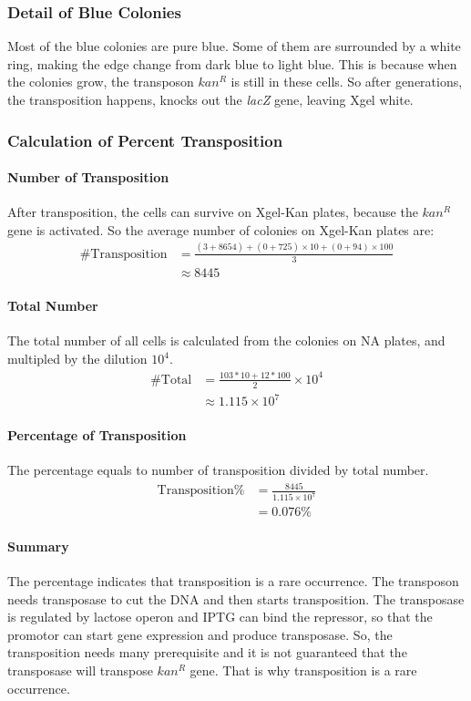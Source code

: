 \documentclass{article}
\begin{document}
			\subsubsection{Detail of Blue Colonies}
			Most of the blue colonies are pure blue. Some of them are surrounded by a white ring, making the edge change from dark blue to light blue. This is because when the colonies grow, the transposon $kan^R$ is still in these cells. So after generations, the transposition happens, knocks out the \emph{lacZ} gene, leaving Xgel white.

			\subsubsection{Calculation of Percent Transposition}
			\paragraph{Number of Transposition} After transposition, the cells can survive on Xgel-Kan plates, because the $kan^R$ gene is activated. So the average number of colonies on Xgel-Kan plates are:
			$$
			\begin{aligned}
			\#\text{Transposition} &= \frac{(3 + 8654) + (0 + 725) \times 10 + (0 + 94)\times 100}{3}\\
			&\approx 8445
			\end{aligned}
			$$
			\paragraph{Total Number} The total number of all cells is calculated from the colonies on NA plates, and multipled by the dilution $10 ^ 4$.
			$$
			\begin{aligned}
			\#\text{Total} &= \frac{103 * 10 + 12 * 100}{2} \times 10 ^4\\
			&\approx 1.115 \times 10 ^ 7
			\end{aligned}
			$$
			\paragraph{Percentage of Transposition} The percentage equals to number of transposition divided by total number.
			$$
			\begin{aligned}
			\text{Transposition}\% &= \frac{8445}{1.115 \times 10 ^ 7}\\
			&= 0.076\%
			\end{aligned}
			$$
			\paragraph{Summary} The percentage indicates that transposition is a rare occurrence. The transposon needs transposase to cut the DNA and then starts transposition. The transposase is regulated by lactose operon and IPTG can bind the repressor, so that the promotor can start gene expression and produce transposase. So, the transposition needs many prerequisite and it is not guaranteed that the transposase will transpose $kan^R$ gene. That is why transposition is a rare occurrence.
\end{document}
